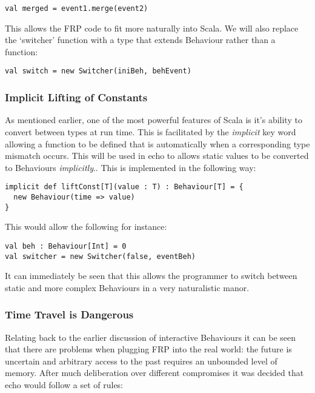 \documentclass[12pt]{article}
\begin{document}
\begin{verbatim}
val merged = event1.merge(event2)
\end{verbatim}

      This allows the FRP code to fit more naturally into Scala. We will also replace the `switcher' function
      with a type that extends Behaviour rather than a function:
      
\begin{verbatim}
val switch = new Switcher(iniBeh, behEvent)
\end{verbatim}

      \subsubsection{Implicit Lifting of Constants}
        As mentioned earlier, one of the most powerful features of Scala is it's ability to convert between
        types at run time. This is facilitated by the \emph{implicit} key word allowing a function to be defined
        that is automatically when a corresponding type mismatch occurs. This will be used in echo to allows 
        static values to be converted to Behaviours \emph{implicitly}.. This is implemented in the following way:  

\begin{verbatim}
implicit def liftConst[T](value : T) : Behaviour[T] = {
  new Behaviour(time => value)
}
\end{verbatim}              
        
        This would allow the following for instance:
 
\begin{verbatim}
val beh : Behaviour[Int] = 0
val switcher = new Switcher(false, eventBeh)
\end{verbatim}       

        It can immediately be seen that this allows the programmer to switch between static and more complex
        Behaviours in a very naturalistic manor.
      
      \subsubsection{Time Travel is Dangerous}
        Relating back to the earlier discussion of interactive Behaviours it can be seen
        that there are problems when plugging FRP into the real world: the future is uncertain and
        arbitrary access to the past requires an unbounded level of memory. After much deliberation
        over different compromises it was decided that echo would follow a set of rules:
        
\end{document}
